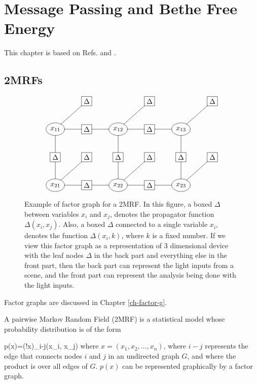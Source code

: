 \chapter{Message Passing and 
Bethe Free Energy}
\label{ch-mpass-bethe}

\newcommand{\ttheta}[0]{\TIL{\theta}}
\newcommand{\tP}[0]{\TIL{p}}

This chapter is based
on Refs. \cite{WainJordan}
and \cite{yedidia}.

\section{2MRFs}



\begin{figure}[h!]
$$\xymatrix{
&*+[F]{\Delta}
&
&*+[F]{\Delta}
&
&*+[F]{\Delta}
\\
*++[o][F]{x_{11}}
\ar@{-}[d]\ar@{-}[r]\ar@{-}[ru]
&*+[F]{\Delta}\ar@{-}[r]
&*++[o][F]{x_{12}}\ar@{-}[d]\ar@{-}[r]
\ar@{-}[ru]
&*+[F]{\Delta}\ar@{-}[r]
&*++[o][F]{x_{13}}\ar@{-}[d]
\ar@{-}[ru]
\\
*+[F]{\Delta}\ar@{-}[d]
&*+[F]{\Delta}
&*+[F]{\Delta}\ar@{-}[d]
&*+[F]{\Delta}
&*+[F]{\Delta}\ar@{-}[d]
&*+[F]{\Delta}
\\
*++[o][F]{x_{21}}\ar@{-}[r]\ar@{-}[ru]
&*+[F]{\Delta}\ar@{-}[r]
&*++[o][F]{x_{22}}\ar@{-}[r]\ar@{-}[ru]
&*+[F]{\Delta}\ar@{-}[r]
&*++[o][F]{x_{23}}\ar@{-}[ru]
}$$
\caption{Example
of factor graph
for a 2MRF.
In this figure,
a boxed $\Delta$
between variables $x_i$
and $x_j$,
denotes the propagator  function
$\Delta(x_i, x_j)$.
Also, a boxed
$\Delta$
connected to a
single variable $x_i$,
denotes the function
$\Delta(x_i, k)$,
where $k$
is a fixed number.
If we view this factor graph
as a representation of 3 dimensional device
with the leaf nodes $\Delta$
in the back part and everything else in the front part,
then the back part can represent the light inputs from a scene, and the front part
can represent the analysis being done 
with the light inputs.
}
\label{fig-paiwise-mrf}
\end{figure}

Factor graphs
are discussed in Chapter \ref{ch-factor-g}.

A pairwise Markov Random Field (2MRF)
is a statistical model 
whose probability
distribution
is of the form

\beq
p(x)=\caln(!x)\prod_{i-j}\Delta(x_i, x_j)
\label{eq-2mrf}
\eeq
where $x=(x_1, x_2,
\ldots, x_n )$,
where $i-j$
represents the edge
that connects
nodes $i$ and $j$
in an undirected graph $G$,
and where  the product 
is over all edges of $G$.
$p(x)$ can be represented
graphically
by a factor graph.


